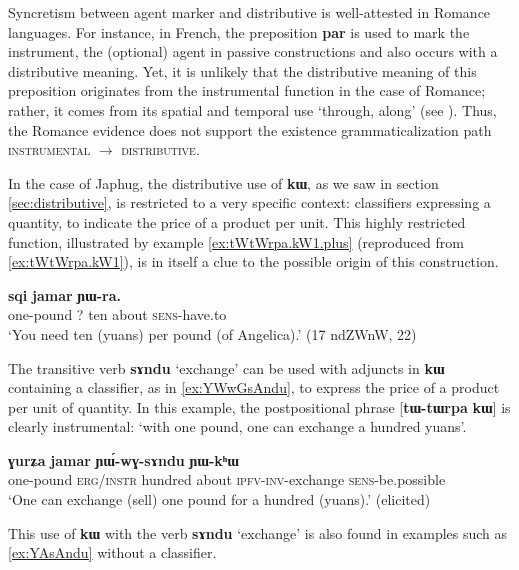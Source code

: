 \documentclass[oldfontcommands,oneside,a4paper,11pt]{article}
\newcommand{\ipa}[1]{{\phon\textbf{#1}}}
\begin{document}
Syncretism between agent marker and distributive is well-attested in Romance languages. For instance, in French, the preposition  \ipa{par}  is used to mark the instrument, the (optional) agent in passive constructions and also occurs with a distributive meaning. Yet, it is unlikely that the distributive meaning of this preposition originates from the instrumental function in the case of Romance; rather, it comes from its  spatial and temporal use `through, along' (see \citealt[213]{wartburg58few8}). 
Thus, the Romance evidence does not support the existence grammaticalization path \textsc{instrumental} $\rightarrow$ \textsc{distributive}.

In the case of Japhug, the distributive use of \ipa{kɯ}, as we saw in section \ref{sec:distributive}, is restricted to a very specific context: classifiers expressing a quantity, to indicate the price of a product per unit. This highly restricted function, illustrated by example \ref{ex:tWtWrpa.kW1.plus} (reproduced from \ref{ex:tWtWrpa.kW1}), is in itself a clue to the possible origin of this construction.


 \begin{exe} 
\ex \label{ex:tWtWrpa.kW1.plus}
\gll  
[\ipa{tɯ-tɯrpa}] 	\ipa{\textbf{kɯ}} 	\ipa{sqi} 	\ipa{jamar} 	\ipa{ɲɯ-ra.} 	\\
one-pound ?{ } ten about \textsc{sens}-have.to \\
\glt `You need ten (yuans) per pound (of Angelica).' (17 ndZWnW, 22)
\end{exe}  

The transitive verb \ipa{sɤndu} `exchange' can be used with adjuncts in \ipa{kɯ} containing a classifier, as in \ref{ex:YWwGsAndu}, to express the price of a product per unit of quantity. In this example, the postpositional phrase [\ipa{tɯ-tɯrpa} 	\ipa{kɯ}] is clearly instrumental: `with one pound, one can exchange a hundred yuans'.

  \begin{exe}
\ex \label{ex:YWwGsAndu}
\gll 
[\ipa{tɯ-tɯrpa}]  	\ipa{kɯ}  	\ipa{ɣurʑa}  	\ipa{jamar}  	\ipa{ɲɯ́-wɣ-sɤndu}  	\ipa{ɲɯ-kʰɯ}  \\
one-pound \textsc{erg/instr} hundred about \textsc{ipfv-inv}-exchange \textsc{sens}-be.possible \\
\glt `One can exchange (sell) one pound for a hundred (yuans).' (elicited)
\end{exe}

This use of \ipa{kɯ} with the verb \ipa{sɤndu} `exchange' is also found in examples such as \ref{ex:YAsAndu} without a classifier.
\end{document}
